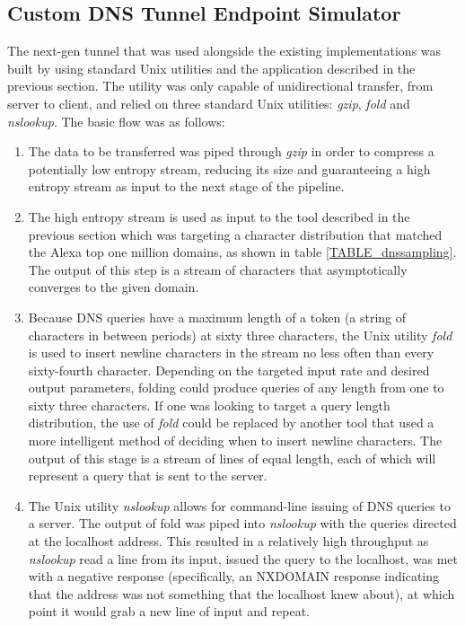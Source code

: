 \documentclass[12pt]{report}
\theoremstyle{remark}
\theoremstyle{definition}
\theoremstyle{definition}
\theoremstyle{definition}
\begin{document}
\begin{appendices}
%

\section{Custom DNS Tunnel Endpoint Simulator}
\label{appendix-customdns}

The next-gen tunnel that was used alongside the existing implementations was
built by using standard Unix utilities and the application described in the
previous section. The utility was only capable of unidirectional transfer, from
server to client, and relied on three standard Unix utilities: \emph{gzip},
\emph{fold} and \emph{nslookup}. The basic flow was as follows:

\begin{enumerate} \item The data to be transferred was piped through \emph{gzip}
in order to compress a potentially low entropy stream, reducing its size and
guaranteeing a high entropy stream as input to the next stage of the pipeline.

\item The high entropy stream is used as input to the tool described in the
previous section which was targeting a character distribution that matched the
Alexa top one million domains, as shown in table \ref{TABLE_dnssampling}. The
output of this step is a stream of characters that asymptotically converges to
the given domain.

\item Because DNS queries have a maximum length of a token (a string of
characters in between periods) at sixty three characters, the Unix utility
\emph{fold} is used to insert newline characters in the stream no less often
than every sixty-fourth character. Depending on the targeted input rate and
desired output parameters, folding could produce queries of any length from one
to sixty three characters. If one was looking to target a query length
distribution, the use of \emph{fold} could be replaced by another tool that used
a more intelligent method of deciding when to insert newline characters. The
output of this stage is a stream of lines of equal length, each of which will
represent a query that is sent to the server.

\item The Unix utility \emph{nslookup} allows for command-line issuing of DNS
queries to a server. The output of fold was piped into \emph{nslookup} with the
queries directed at the localhost address. This resulted in a relatively high
throughput as \emph{nslookup} read a line from its input, issued the query to
the localhost, was met with a negative response (specifically, an NXDOMAIN
response indicating that the address was not something that the localhost knew
about), at which point it would grab a new line of input and repeat.
\end{enumerate}


\end{appendices}
\end{document}

